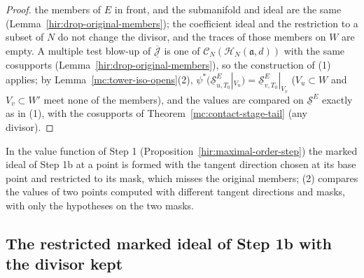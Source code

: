 \begin{proof}
the members of \(E\) in front, and the submanifold and ideal are the same (Lemma~\ref{hir:drop-original-members}); the coefficient ideal and the restriction to a
subset of \(N\) do not change the divisor, and the traces of those members on \(W\) are empty. A multiple test blow-up of \(\overline{\underline{\mathcal J}}\) is one of
\(\mathcal C_N(\mathcal H_N(\mathfrak a,d))\) with the same cosupports (Lemma~\ref{hir:drop-original-members}), so the construction of (1) applies; by
Lemma~\ref{mc:tower-iso-opens}(2), \(\psi^*(\underline{\mathcal S}^E_{u,T_0}|_{V_u})=\underline{\mathcal S}^E_{v,T_0}|_{V_v}\) (\(V_u\subset W\) and \(V_v\subset W'\) meet none of
the members), and the values are compared on \(\underline{\mathcal S}^E\) exactly as in (1), with the cosupports of Theorem~\ref{mc:contact-stage-tail} (any divisor).
\end{proof}
In the value function of Step 1 (Proposition~\ref{hir:maximal-order-step}) the marked ideal of Step 1b at a point is formed with the tangent direction chosen at its
base point and restricted to its mask, which misses the original members; (2) compares the values of two points computed with different tangent directions and
masks, with only the hypotheses on the two masks.

\subsection{The restricted marked ideal of Step 1b with the divisor kept}

